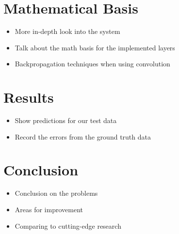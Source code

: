 \documentclass[12pt]{article}
\begin{document}
\section*{Mathematical Basis}
\label{sec:org20a6c39}
\begin{itemize}
\item More in-depth look into the system
\item Talk about the math basis for the implemented layers
\item Backpropagation techniques when using convolution
\end{itemize}

\section*{Results}
\label{sec:org6c0b678}
\begin{itemize}
\item Show predictions for our test data
\item Record the errors from the ground truth data
\end{itemize}

\section*{Conclusion}
\label{sec:org520bb78}
\begin{itemize}
\item Conclusion on the problems
\item Areas for improvement
\item Comparing to cutting-edge research
\end{itemize}
\end{document}
